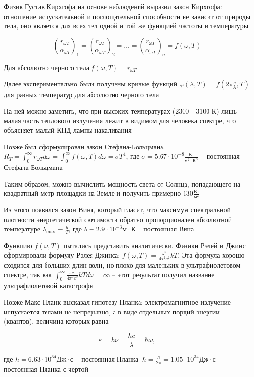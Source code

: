Физик Густав Кирхгофа на основе наблюдений выразил закон Кирхгофа: отношение испускательной и поглощательной способности не зависит от природы тела, оно является для всех тел одной и той же функцией частоты и температуры

\[\left(\frac{r_{\omega T}}{\alpha_{\omega T}}\right)_1 = \left(\frac{r_{\omega T}}{\alpha_{\omega T}}\right)_2 = \dots = \left(\frac{r_{\omega T}}{\alpha_{\omega T}}\right)_n = f(\omega, T)\]

Для абсолютно черного тела $f(\omega, T) = r_{\omega T}$

Далее экспериментально были получены кривые функций $\varphi(\lambda, T) = f\left(2\pi \frac{c}{\lambda}, T\right)$ для разных температур для абсолютно черного тела

На ней можно заметить, что при высоких температурах (2300 - 3100 К) лишь малая часть теплового излучения лежит в видимом для человека спектре, что объясняет малый КПД лампы накаливания


Позже был сформулирован закон Стефана-Больцмана: $R_T = \int_0^\infty r_{\omega T} d\omega = \int_0^\infty f(\omega, T) d\omega = \sigma T^4$, где $\sigma = 5.67 \cdot 10^{-8} \frac{\text{Вт}}{\text{м}^2 \cdot \text{К}^4}$ -- постоянная Стефана-Больцмана

Таким образом, можно вычислить мощность света от Солнца, попадающего на квадратный метр площадки на Земле и получить примерно $130 \frac{\text{Вт}}{\text{м}^2}$

Из этого появился закон Вина, который гласит, что максимум спектральной плотности энергетической светимости обратно пропорционален абсолютной температуре $\lambda_{\max} = \frac{b}{T}$, где $b = 2.9 \cdot 10^{-3} \text{м}\cdot\text{К}$ -- постоянная Вина

Функцию $f(\omega, T)$ пытались представить аналитически. Физики Рэлей и Джинс сформировали формулу Рэлея-Джинса: $f(\omega, T) = \frac{\omega^2}{4\pi^2 c^2} kT$. Эта формула хорошо сходится для больших длин волн, но плохо для маленьких в ультрафиолетовом спектре, так как $\int_0^\infty \frac{\omega^2}{4\pi^2 c^2} kT d\omega = \infty$ -- этот результат получил название ультрафиолетовой катастрофы

Позже Макс Планк высказал гипотезу Планка: электромагнитное излучение испускается телами не непрерывно, а в виде отдельных порций энергии (квантов), величина которых равна 

\[\varepsilon = h \nu = \frac{h c}{\lambda} = \hbar \omega,\]

где $h = 6.63 \cdot 10^{34} \text{Дж}\cdot\text{с}$ -- постоянная Планка, $\hbar = \frac{h}{2\pi} = 1.05 \cdot 10^{34} \text{Дж}\cdot\text{с}$ -- постоянная Планка с чертой

